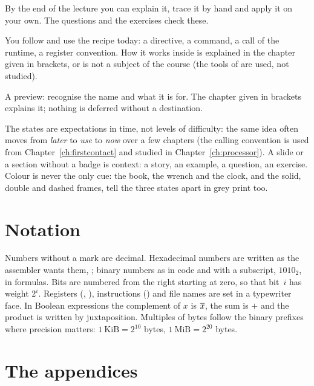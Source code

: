 \begin{description}[style=nextline,leftmargin=1.5em]
\item[\masterychip{now}{UNDERSTAND NOW}] By the end of the lecture you can explain it,
  trace it by hand and apply it on your own. The questions and the exercises check these.
\item[\masterychip{use}{USE NOW}] You follow and use the recipe today: a directive, a command,
  a call of the runtime, a register convention. How it works inside is explained in the
  chapter given in brackets, or is not a subject of the course (the tools of \prg are used,
  not studied).
\item[\masterychip{later}{UNDERSTAND LATER}] A preview: recognise the name and what it is
  for. The chapter given in brackets explains it; nothing is deferred without a destination.
\end{description}

The states are expectations in time, not levels of difficulty: the same idea often moves
from \emph{later} to \emph{use} to \emph{now} over a few chapters (the calling convention is
used from Chapter~\ref{ch:firstcontact} and studied in Chapter~\ref{ch:processor}). A slide or a
section without a badge is context: a story, an example, a question, an exercise. Colour is
never the only cue: the book, the wrench and the clock, and the solid, double and dashed
frames, tell the three states apart in grey print too.

\section*{Notation}

Numbers without a mark are decimal. Hexadecimal numbers are written as the
assembler wants them, ; binary numbers as  in code and
with a subscript, $1010_2$, in formulas. Bits are numbered from the right
starting at zero, so that bit~$i$ has weight $2^{i}$. Registers
(, ), instructions () and file names are set in a
typewriter face. In Boolean expressions the complement of $x$ is $\overline{x}$,
the sum is $+$ and the product is written by juxtaposition. Multiples of bytes
follow the binary prefixes where precision matters:
$1~\mathrm{KiB}=2^{10}$ bytes, $1~\mathrm{MiB}=2^{20}$ bytes.

\section*{The appendices}


